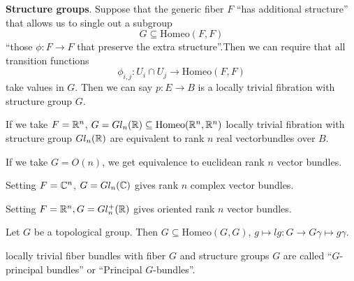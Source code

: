 \documentclass[language=english]{TemplateLecture}
\begin{document}
\textbf{Structure groups}.
Suppose that the generic fiber \(F\) \enquote{has additional structure} that allows us to single out a subgroup
\[G \subseteq \mathrm{Homeo}(F,F)\]
\enquote{those \(\phi\colon F \to F\) that preserve the extra structure}.Then we can require that all transition functions
\[\phi_{i,j}\colon U_i \cap U_j \to \mathrm{Homeo}(F,F)\]
{take values in \(G\)}. Then we can say \(p \colon E \to B\) is a locally trivial fibration with structure group \(G\).

If we take \(F = \mathbb{R}^n\), \(G = Gl_n(\mathbb{R}) \subseteq \mathrm{Homeo}(\mathbb{R}^n, \mathbb{R}^n)\) locally trivial fibration with structure group \(Gl_n(\mathbb{R})\) are equivalent to rank \(n\) real vectorbundles over \(B\).

If we take \(G = O(n)\), we get equivalence to euclidean rank \(n\) vector bundles.

Setting \(F = \mathbb{C}^n\), \(G = Gl_n(\mathbb{C})\) gives rank \(n\) complex vector bundles.

Setting \(F = \mathbb{R}^n, G = Gl_n^+(\mathbb{R})\) gives oriented rank \(n\) vector bundles.


\begin{example}
    Let \(G\) be a topological group. Then \(G \subseteq \mathrm{Homeo}(G,G)\), \(g \mapsto lg\colon G \to G \gamma\mapsto g\gamma\).

    locally trivial fiber bundles with fiber \(G\) and structure groups \(G\) are called \enquote{\(G\)-principal bundles} or \enquote{Principal \(G\)-bundles}.
\end{example}
\end{document}
